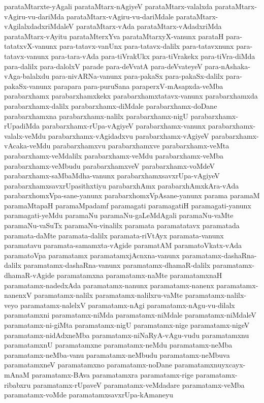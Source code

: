 {parataMtarxte-yAgali
parataMtarx-nAgiyeV
parataMtarx-valalxda
parataMtarx-vAgiru-vu-dariMda
parataMtarx-vAgiru-vu-dariMdale
parataMtarx-vAgilalxdadxriMdaleV
parataMtarx-vAda
parataMtarx-vAdadxriMda
parataMtarx-vAyitu
parataMterxYva
parataMtarxyX-vanunx
parataH
para-tatatxvX-vanunx
para-tatavx-vanUnx
para-tatavx-dalilx
para-tatavxnunx
para-tatavx-vanunx
para-tara-vAda
para-tiVrakUkx
para-tiVrakekx
para-tiVra-diMda
para-dalilx
para-dalolxV
parade
para-deVvatA
para-deVvateyeV
para-nAshaka-vAga-balalxdu
para-nivARNa-vanunx
para-pakaSx
para-pakaSx-dalilx
para-pakaSx-vanunx
parapara
para-puruSana
paraperxV-mAsapxda-veMba
parabarxhamx
parabarxhamxkekx
parabarxhamxtatavx-vanunx
parabarxhamxda
parabarxhamx-dalilx
parabarxhamx-diMdale
parabarxhamx-doDane
parabarxhamxna
parabarxhamx-nalilx
parabarxhamx-nigU
parabarxhamx-rUpadiMda
parabarxhamx-rUpa-vAgiyeV
parabarxhamx-vanunx
parabarxhamx-valalx-veMdu
parabarxhamx-vAgidadxvu
parabarxhamx-vAgiyeV
parabarxhamx-vAcaka-veMdu
parabarxhamxvu
parabarxhamxve
parabarxhamx-veMta
parabarxhamx-veMdalilx
parabarxhamx-veMdu
parabarxhamx-veMba
parabarxhamx-veMbudu
parabarxhamxveV
parabarxhamx-voMdeV
parabarxhamx-saMbaMdha-vanunx
parabarxhamxsavxrUpa-vAgiyeV
parabarxhamxsavxrUpasithxtiyu
parabarxhAmx
parabarxhAmxkAra-vAda
parabarxhomxVpa-sane-yanunx
parabarxhomxVpAsane-yanunx
parama
paramaM
paramaMtapaH
paramaMpadamf
paramagati
paramagatiH
paramagati-yanunx
paramagati-yeMdu
paramaNu
paramaNu-gaLeMdAgali
paramaNu-vaMte
paramaNu-vaSuTx
paramaNu-vinalilx
paramata
paramatatavx
paramatada
paramata-daMte
paramata-dalilx
paramata-riVtAyx
paramata-vanunx
paramatavu
paramata-samamxta-vAgide
paramatAM
paramatoVkatx-vAda
paramatoVpa
paramatamx
paramatamxjAcnxna-vanunx
paramatamx-dashaRna-dalilx
paramatamx-dashaRna-vanunx
paramatamx-dhamaR-dalilx
paramatamx-dhamaR-vAgide
paramatamxna
paramatamx-naMte
paramatamxnaH
paramatamx-nadedxAda
paramatamx-nanunx
paramatamx-nanenx
paramatamx-nanenxV
paramatamx-nalilx
paramatamx-nalilxru-vaMte
paramatamx-nalilx-veyo
paramatamx-nalelxV
paramatamx-nAgi
paramatamx-nAgu-vu-dilalx
paramatamxni
paramatamx-niMda
paramatamx-niMdale
paramatamx-niMdaleV
paramatamx-ni-giMta
paramatamx-nigU
paramatamx-nige
paramatamx-nigeV
paramatamx-nidAdxneMba
paramatamx-niNaRyA-vAgu-vudu
paramatamxnu
paramatamxnU
paramatamxne
paramatamx-neMdu
paramatamx-neMba
paramatamx-neMba-vanu
paramatamx-neMbudu
paramatamx-neMbuva
paramatamxneV
paramatamxno
paramatamx-noDane
paramatamxnuyxcayx-mAnaM
paramatamx-BAva
paramatamxra
paramatamx-rige
paramatamx-ribabxru
paramatamx-rUpaveV
paramatamx-veMdadare
paramatamx-veMba
paramatamx-voMde
paramatamxsavxrUpa-kAmaneyu
}
